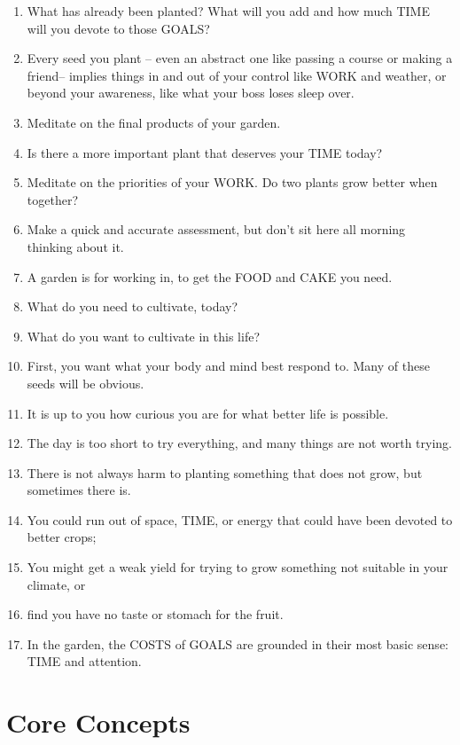 \documentclass[
]{book}
\begin{document}
\begin{enumerate}
\item
  What has already been planted? What will you add and how much TIME will you
  devote to those GOALS?
\item
  Every seed you plant -- even an abstract one like passing a course or making a
  friend-- implies things in and out of your control like WORK and weather, or
  beyond your awareness, like what your boss loses sleep over.
\item
  Meditate on the final products of your garden.
\item
  Is there a more important plant that deserves your TIME today?
\item
  Meditate on the priorities of your WORK. Do two plants grow better when
  together?
\item
  Make a quick and accurate assessment, but don't sit here all morning thinking
  about it.
\item
  A garden is for working in, to get the FOOD and CAKE you need.
\item
  What do you need to cultivate, today?
\item
  What do you want to cultivate in this life?
\item
  First, you want what your body and mind best respond to. Many of these seeds
  will be obvious.
\item
  It is up to you how curious you are for what better life is possible.
\item
  The day is too short to try everything, and many things are not worth trying.
\item
  There is not always harm to planting something that does not grow, but
  sometimes there is.
\item
  You could run out of space, TIME, or energy that could have been devoted to
  better crops;
\item
  You might get a weak yield for trying to grow something not suitable in your
  climate, or
\item
  find you have no taste or stomach for the fruit.
\item
  In the garden, the COSTS of GOALS are grounded in their most basic sense: TIME
  and attention.
\end{enumerate}

\hypertarget{core-concepts}{%
\section{Core Concepts}\label{core-concepts}}
\end{document}
